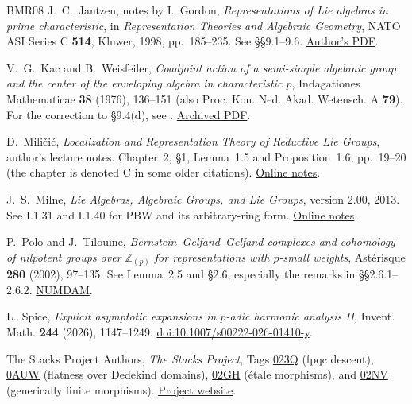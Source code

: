 \documentclass[twoside,a4paper,12pt,reqno]{amsart}
\theoremstyle{remark}
\numberwithin{equation}{section}
\newcommand{\Z}{\mathbb Z}
\begin{document}
\begin{thebibliography}{BMR08}
J.~C.~Jantzen, notes by I.~Gordon,
\emph{Representations of Lie algebras in prime characteristic},
in \emph{Representation Theories and Algebraic Geometry},
NATO ASI Series C \textbf{514}, Kluwer, 1998, pp.~185--235.
See \S\S9.1--9.6.
\href{https://users-math.au.dk/jantzen/mntrl.pdf}{Author's PDF}.

V.~G.~Kac and B.~Weisfeiler,
\emph{Coadjoint action of a semi-simple algebraic group and the center of the enveloping algebra in characteristic \(p\)},
Indagationes Mathematicae \textbf{38} (1976), 136--151
(also Proc. Kon. Ned. Akad. Wetensch. A \textbf{79}).
For the correction to \S9.4(d), see \cite[\S2.6.1, Remark]{PT}.
\href{https://weisfeiler.com/boris/papers/1976-indag.pdf}{Archived PDF}.

D.~Mili\v{c}i\'c,
\emph{Localization and Representation Theory of Reductive Lie Groups},
author's lecture notes.
Chapter~2, \S1, Lemma~1.5 and Proposition~1.6, pp.~19--20
(the chapter is denoted C in some older citations).
\href{https://www.math.utah.edu/~milicic/Eprints/book.pdf}{Online notes}.

J.~S.~Milne,
\emph{Lie Algebras, Algebraic Groups, and Lie Groups},
version 2.00, 2013.
See I.1.31 and I.1.40 for PBW and its arbitrary-ring form.
\href{https://www.jmilne.org/math/CourseNotes/LAG.pdf}{Online notes}.

P.~Polo and J.~Tilouine,
\emph{Bernstein--Gelfand--Gelfand complexes and cohomology of nilpotent groups over \(\Z_{(p)}\) for representations with \(p\)-small weights},
Ast\'erisque \textbf{280} (2002), 97--135.
See Lemma~2.5 and \S2.6, especially the remarks in \S\S2.6.1--2.6.2.
\href{https://www.numdam.org/item/AST_2002__280__97_0/}{NUMDAM}.

L.~Spice,
\emph{Explicit asymptotic expansions in \(p\)-adic harmonic analysis II},
Invent. Math. \textbf{244} (2026), 1147--1249.
\href{https://doi.org/10.1007/s00222-026-01410-y}{doi:10.1007/s00222-026-01410-y}.

The Stacks Project Authors,
\emph{The Stacks Project},
Tags \href{https://stacks.math.columbia.edu/tag/023Q}{023Q} (fpqc descent),
\href{https://stacks.math.columbia.edu/tag/0AUW}{0AUW} (flatness over Dedekind domains),
\href{https://stacks.math.columbia.edu/tag/02GH}{02GH} (\'{e}tale morphisms), and
\href{https://stacks.math.columbia.edu/tag/02NV}{02NV} (generically finite morphisms).
\href{https://stacks.math.columbia.edu/}{Project website}.


\end{thebibliography}
\end{document}

